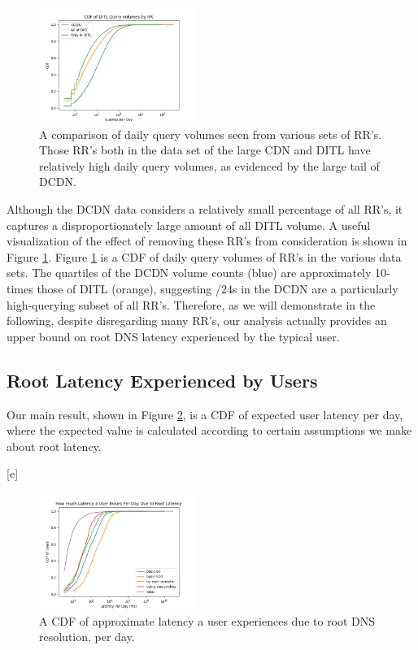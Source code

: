 \documentclass[sigconf,nonacm,10pt]{acmart}
\begin{document}
\begin{figure}
    \centering
    \includegraphics[width=0.45\textwidth]{figures/ditl_volume_comparisons.png}
    \caption{A comparison of daily query volumes seen from various sets of RR's. Those RR's both in the data set of the large CDN and DITL have relatively high daily query volumes, as evidenced by the large tail of DCDN. }
    \label{fig:ditl_volume_comparisons}
\end{figure}

Although the DCDN data considers a relatively small percentage of all
RR's, it captures a disproportionately large amount of all DITL volume.
A useful visualization of the effect of removing these RR's from
consideration is shown in Figure \ref{fig:ditl_volume_comparisons}.
Figure \ref{fig:ditl_volume_comparisons} is a CDF of daily query volumes
of RR's in the various data sets. The quartiles of the DCDN volume
counts (blue) are approximately 10-times those of DITL (orange),
suggesting /24s in the DCDN are a particularly high-querying subset of
all RR's. Therefore, as we will demonstrate in the following, despite
disregarding many RR's, our analysis actually provides an upper bound on
root DNS latency experienced by the typical user.

\subsection{Root Latency Experienced by
Users}\label{root-latency-experienced-by-users-1}

\label{sec:rr_global_look_analysis} Our main result, shown in Figure
\ref{fig:user_root_latency_per_day}, is a CDF of expected user latency
per day, where the expected value is calculated according to certain
assumptions we make about root latency.

{[}e{]}

\begin{figure}
    \centering
    \includegraphics[width=0.45\textwidth]{figures/user_root_latency_per_day.png}
    \caption{A CDF of approximate latency a user experiences due to root DNS resolution, per day.}
    \label{fig:user_root_latency_per_day}
\end{figure}
\end{document}
